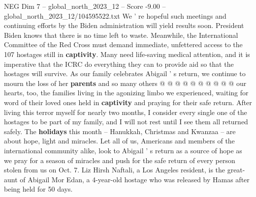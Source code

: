 \begin{textsample}{NEG Dim 7 – global\_north\_2023\_12 – Score -9.00 – global\_north\_2023\_12/104595522.txt}
We ' re hopeful such meetings and continuing efforts by the Biden administration will yield results soon.
President Biden knows that there is no time left to waste.
Meanwhile, the International Committee of the Red Cross must demand immediate, unfettered access to the 107 hostages still in \textbf{captivity}.
Many need life-saving medical attention, and it is imperative that the ICRC do everything they can to provide aid so that the hostages will survive.
As our family celebrates Abigail ' s return, we continue to mourn the loss of her \textbf{parents} and so many others @ @ @ @ @ @ @ @ @ @ our hearts, too, the families living in the agonizing limbo we experienced, waiting for word of their loved ones held in \textbf{captivity} and praying for their safe return.
After living this terror myself for nearly two months, I consider every single one of the hostages to be part of my family, and I will not rest until I see them all returned safely.
The \textbf{holidays} this month -- Hanukkah, Christmas and Kwanzaa -- are about hope, light and miracles.
Let all of us, Americans and members of the international community alike, look to Abigail ' s return as a source of hope as we pray for a season of miracles and push for the safe return of every person stolen from us on Oct. 7.
Liz Hirsh Naftali, a Los Angeles resident, is the great-aunt of Abigail Mor Edan, a 4-year-old hostage who was released by Hamas after being held for 50 days.

\end{textsample}
